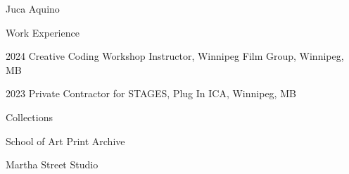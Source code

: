 \documentclass[12pt]{article}
\begin{document}
\begin{cv}{Juca Aquino}
\begin{cvlist}{Work Experience}
\item[2024] Creative Coding Workshop Instructor, Winnipeg Film Group, Winnipeg, MB
\item[2023] Private Contractor for STAGES, Plug In ICA, Winnipeg, MB
\end{cvlist}

\begin{cvlist}{Collections}
\item[School of Art Print Archive] {}
\item[Martha Street Studio] {}
\end{cvlist}

\end{cv}
\end{document}
